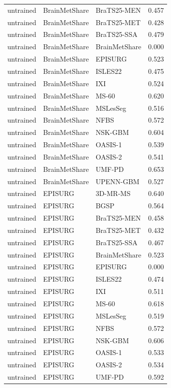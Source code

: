 \begin{tabular}{lllr}
untrained & BrainMetShare & BraTS25-MEN & 0.457 \\
untrained & BrainMetShare & BraTS25-MET & 0.428 \\
untrained & BrainMetShare & BraTS25-SSA & 0.479 \\
untrained & BrainMetShare & BrainMetShare & 0.000 \\
untrained & BrainMetShare & EPISURG & 0.523 \\
untrained & BrainMetShare & ISLES22 & 0.475 \\
untrained & BrainMetShare & IXI & 0.524 \\
untrained & BrainMetShare & MS-60 & 0.620 \\
untrained & BrainMetShare & MSLesSeg & 0.516 \\
untrained & BrainMetShare & NFBS & 0.572 \\
untrained & BrainMetShare & NSK-GBM & 0.604 \\
untrained & BrainMetShare & OASIS-1 & 0.539 \\
untrained & BrainMetShare & OASIS-2 & 0.541 \\
untrained & BrainMetShare & UMF-PD & 0.653 \\
untrained & BrainMetShare & UPENN-GBM & 0.527 \\
untrained & EPISURG & 3D-MR-MS & 0.640 \\
untrained & EPISURG & BGSP & 0.564 \\
untrained & EPISURG & BraTS25-MEN & 0.458 \\
untrained & EPISURG & BraTS25-MET & 0.432 \\
untrained & EPISURG & BraTS25-SSA & 0.467 \\
untrained & EPISURG & BrainMetShare & 0.523 \\
untrained & EPISURG & EPISURG & 0.000 \\
untrained & EPISURG & ISLES22 & 0.474 \\
untrained & EPISURG & IXI & 0.511 \\
untrained & EPISURG & MS-60 & 0.618 \\
untrained & EPISURG & MSLesSeg & 0.519 \\
untrained & EPISURG & NFBS & 0.572 \\
untrained & EPISURG & NSK-GBM & 0.606 \\
untrained & EPISURG & OASIS-1 & 0.533 \\
untrained & EPISURG & OASIS-2 & 0.534 \\
untrained & EPISURG & UMF-PD & 0.592 \\

\end{tabular}
